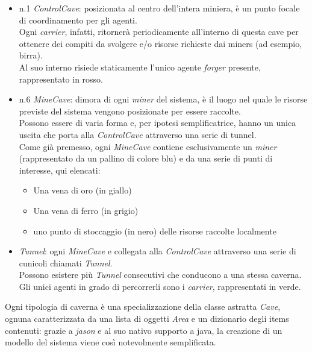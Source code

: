 \documentclass{llncs}
\begin{document}
\begin{itemize}
	\item n.1 \textit{ControlCave}: posizionata al centro dell'intera miniera, è un punto focale di coordinamento per gli agenti.\\
	Ogni \textit{carrier}, infatti, ritornerà periodicamente all'interno di questa cave per ottenere dei compiti da svolgere e/o risorse richieste dai miners (ad esempio, birra).\\Al suo interno risiede staticamente l'unico agente \textit{forger} presente, rappresentato in rosso.\\
	\item n.6 \textit{MineCave}: dimora di ogni \textit{miner} del sistema, è il luogo nel quale le risorse previste del sistema vengono posizionate per essere raccolte.\\ Possono essere di varia forma e, per ipotesi semplificatrice, hanno un unica uscita che porta alla \textit{ControlCave} attraverso una serie di tunnel.\\
	Come già premesso, ogni \textit{MineCave} contiene esclusivamente un \textit{miner} (rappresentato da un pallino di colore blu) e da una serie di punti di interesse, qui elencati:
	\begin{itemize}
		\item Una vena di oro (in giallo)
		\item Una vena di ferro (in grigio)
		\item uno punto di stoccaggio (in nero) delle risorse raccolte localmente
	\end{itemize}\vspace*{0.4cm}
	
	\item \textit{Tunnel}: ogni \textit{MineCave} e collegata alla \textit{ControlCave} attraverso una serie di cunicoli chiamati \textit{Tunnel}.\\ Possono esistere più \textit{Tunnel} consecutivi che conducono a una stessa caverna.\\ Gli unici agenti in grado di percorrerli sono i \textit{carrier}, rappresentati in verde.
\end{itemize}
Ogni tipologia di caverna è una specializzazione della classe astratta \textit{Cave}, ognuna caratterizzata da una lista di oggetti \textit{Area} e un dizionario degli items contenuti: grazie a \textit{jason} e al suo nativo supporto a java, la creazione di un modello del sistema viene così notevolmente semplificata.\\
\end{document}
